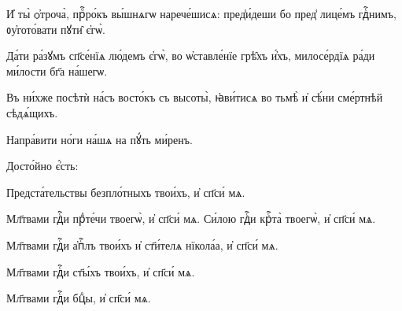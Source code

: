 \hKv И҆ ты̀ ѻ҆троча̀, прⷪ҇ро́къ вы́шнѧгѡ нарече́шисѧ:  пред̾и́деши бо пред̾ лице́мъ гдⷭ҇нимъ, ᲂу҆гото́вати пꙋти̑  є҆гѡ̀. 

\hKv Да́ти ра́зꙋмъ сп҃се́нїѧ лю́демъ є҆гѡ̀, во ѡ҆ставле́нїе  грѣ̑хъ и҆́хъ, милосе́рдїѧ ра́ди ми́лости бг҃а на́шегѡ. 
%

\hKv Въ ни́хже посѣтѝ на́съ восто́къ съ  высоты̀, ꙗ҆ви́тисѧ во тьмѣ̀ и҆ сѣ́ни  сме́ртнѣй сѣдѧ́щихъ. 

\hKv Напра́вити но́ги на́шѧ на пꙋ́ть ми́ренъ. 
%

 Досто́йно є҆́сть: 

%

\hKv Предста́тельствы  безпло́тныхъ твои́хъ, и҆ сп҃си́ мѧ. 

 Мл҃твами гдⷭ҇и прⷣте́чи твоегѡ̀, и҆ сп҃си́  мѧ. 
%
 Си́лою гдⷭ҇и крⷭ҇та̀ твоегѡ̀, и҆  сп҃си́ мѧ. 

 Мл҃твами гдⷭ҇и а҆пⷭ҇лъ твои́хъ и҆ ст҃и́телѧ  нїкола́а, и҆ сп҃си́ мѧ. 

%
\hKv Мл҃твами гдⷭ҇и ст҃ы́хъ твои́хъ, и҆ сп҃си́ мѧ. 


\hKv Мл҃твами  гдⷭ҇и бцⷣы, и҆ сп҃си́ мѧ.  
